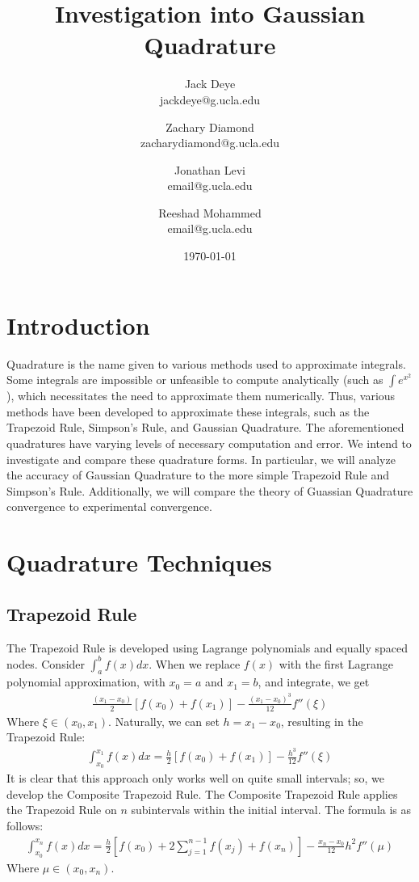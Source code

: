 \documentclass[12pt]{article}
\title{Investigation into Gaussian Quadrature}
\author{
    Jack Deye\\
    jackdeye@g.ucla.edu
    \and
    Zachary Diamond\\
    zacharydiamond@g.ucla.edu
    \and
    Jonathan Levi\\
    email@g.ucla.edu
    \and
    Reeshad Mohammed\\
    email@g.ucla.edu
}
\date{\today}
\begin{document}
\maketitle

\tableofcontents

\newpage

\section{Introduction}

Quadrature is the name given to various methods used to approximate integrals. Some integrals are
impossible or unfeasible to compute analytically (such as $\int e^{x^2}$), which necessitates the need to approximate them numerically.
Thus, various methods have been developed to approximate these integrals, such as the Trapezoid Rule, Simpson's Rule, and Gaussian Quadrature.
The aforementioned quadratures have varying levels of necessary computation and error. We intend to investigate and compare these quadrature forms.
In particular, we will analyze the accuracy of Gaussian Quadrature to the more simple Trapezoid Rule and Simpson's Rule.
Additionally, we will compare the theory of Guassian Quadrature convergence to experimental convergence.

\section{Quadrature Techniques}
\subsection{Trapezoid Rule}
The Trapezoid Rule is developed using Lagrange polynomials and equally spaced nodes. Consider $\int_a^b f(x)dx$. When we replace $f(x)$
with the first Lagrange polynomial approximation, with $x_0 = a$ and $x_1 = b$, and integrate, we get
\begin{align*}
	\frac{(x_1 - x_0)}{2}[f(x_0) + f(x_1)] - \frac{(x_1 - x_0)^3}{12}f''(\xi)
\end{align*}
Where $\xi \in (x_0, x_1)$. Naturally, we can set $h = x_1 - x_0$, resulting in the Trapezoid Rule:
\begin{align*}
	\int_{x_0}^{x_1}f(x)dx = \frac{h}{2}[f(x_0) + f(x_1)] - \frac{h^3}{12}f''(\xi)
\end{align*}
It is clear that this approach only works well on quite small intervals; so, we develop the Composite Trapezoid Rule. The Composite Trapezoid Rule
applies the Trapezoid Rule on $n$ subintervals within the initial interval. The formula is as follows:
\begin{align*}
	\int_{x_0}^{x_n}f(x)dx = \frac{h}{2}[f(x_0) + 2\sum_{j=1}^{n-1}f(x_j) + f(x_n)] - \frac{x_n - x_0}{12}h^2f''(\mu)
\end{align*}
Where $\mu \in (x_0, x_n)$.
\end{document}
